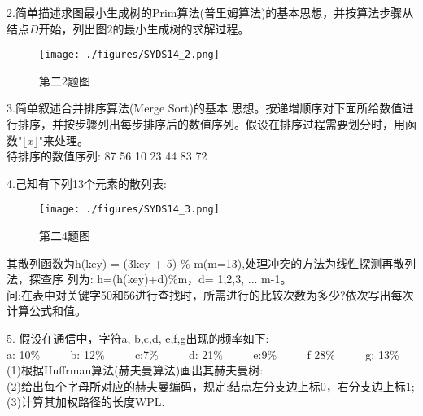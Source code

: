 2.简单描述求图最小生成树的Prim算法(普里姆算法)的基本思想，并按算法步骤从结点$D$开始，列出图$2$的最小生成树的求解过程。
\begin{figure}[ht]
\centering
\texttt{[image: ./figures/SYDS14\_2.png]}
\caption{第二2题图} \label{SYDS14_fig2}
\end{figure}

3.简单叙述合并排序算法(Merge Sort)的基本 思想。按递增顺序对下面所给数值进行排序，并按步骤列出每步排序后的数值序列。假设在排序过程需要划分时，用函数"$\lfloor x \rfloor$"来处理。 \\
待排序的数值序列: 87 56 10 23 44 83 72

4.己知有下列13个元素的散列表:
\begin{figure}[ht]
\centering
\texttt{[image: ./figures/SYDS14\_3.png]}
\caption{第二4题图} \label{SYDS14_fig3}
\end{figure}
其散列函数为h(key) = (3key + 5) \% m(m=13),处理冲突的方法为线性探测再散列法，探查序
列为: h=(h(key)+d)\%m，d= 1,2,3, ... m-1。 \\
问:在表中对关键字50和56进行查找时，所需进行的比较次数为多少?依次写出每次计算公式和值。

5. 假设在通信中，字符a, b,c,d, e,f,g出现的频率如下: \\
a: 10\% $\qquad$ b: 12\% $\qquad$ c:7\% $\qquad$ d: 21\% $\qquad$ e:9\% $\qquad$ f 28\% $\qquad$ g: 13\% \\
(1)根据Huffrman算法(赫夫曼算法)画出其赫夫曼树: \\
(2)给出每个字母所对应的赫夫曼编码，规定:结点左分支边上标0，右分支边上标1; \\
(3)计算其加权路径的长度WPL.

